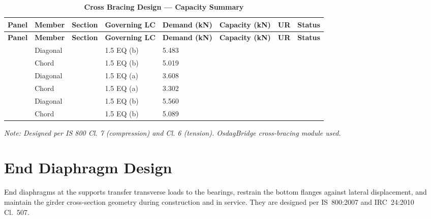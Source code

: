 \documentclass[12pt,a4paper]{report}
\numberwithin{table}{chapter}
\numberwithin{figure}{chapter}
\begin{document}
\vspace{1em}
\begin{longtable}{|C{2.0cm}|L{1.8cm}|C{2.2cm}|C{3.0cm}|C{1.8cm}|C{1.8cm}|C{1.2cm}|C{1.8cm}|}
\caption{\textbf{Cross Bracing Design --- Capacity Summary}}
\hline
{} \textbf{Panel} & \textbf{Member} & \textbf{Section} & \textbf{Governing LC} & \textbf{Demand (kN)} & \textbf{Capacity (kN)} & \textbf{UR} & \textbf{Status} \\[6pt]
\hline
\endfirsthead
\hline
{} \textbf{Panel} & \textbf{Member} & \textbf{Section} & \textbf{Governing LC} & \textbf{Demand (kN)} & \textbf{Capacity (kN)} & \textbf{UR} & \textbf{Status} \\[6pt]
\hline
\endhead
{} & Diagonal &  & 1.5 EQ (b) & 5.483 &  &  &  \\[6pt]
 & Chord &  & 1.5 EQ (b) & 5.019 &  &  &  \\[6pt]
\hline
{} & Diagonal &  & 1.5 EQ (a) & 3.608 &  &  &  \\[6pt]
 & Chord &  & 1.5 EQ (a) & 3.302 &  &  &  \\[6pt]
\hline
{} & Diagonal &  & 1.5 EQ (b) & 5.560 &  &  &  \\[6pt]
 & Chord &  & 1.5 EQ (b) & 5.089 &  &  &  \\[6pt]
\hline
\end{longtable}
\noindent\textit{Note: Designed per IS 800 Cl. 7 (compression) and Cl. 6 (tension). OsdagBridge cross-bracing module used.}

\section{End Diaphragm Design}
\label{sec:end-diaphragm}

End diaphragms at the supports transfer transverse loads to the bearings, restrain the bottom flanges against lateral displacement, and maintain the girder cross-section geometry during construction and in service. They are designed per IS~800:2007 and IRC~24:2010 Cl.~507.

\vspace{1em}

\vspace{0.4em}
\noindent
\setlength{\tabcolsep}{4pt}
\setlength{\LTleft}{0pt}
\setlength{\LTright}{\fill}
\end{document}

